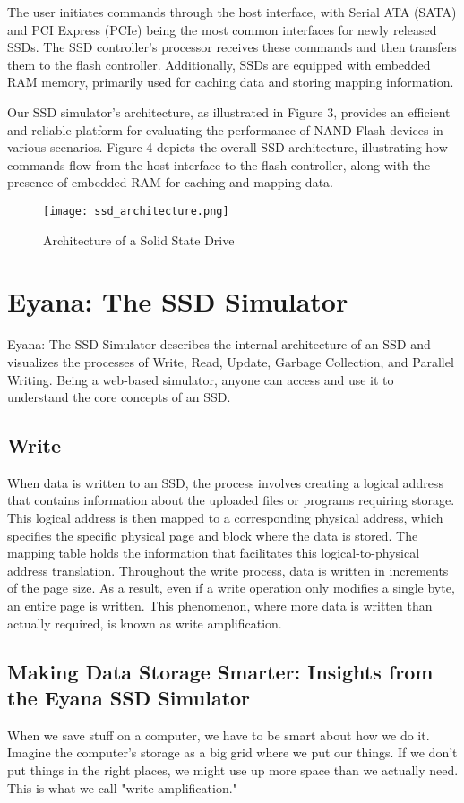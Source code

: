 \documentclass[conference]{/home/habib/Desktop/flash_ssd_simulator_web/paper_writing/latex_file/IEEEtran}
\begin{document}
The user initiates commands through the host interface, with Serial ATA (SATA) and PCI Express (PCIe) being the most common interfaces for newly released SSDs. The SSD controller's processor receives these commands and then transfers them to the flash controller. Additionally, SSDs are equipped with embedded RAM memory, primarily used for caching data and storing mapping information.

Our SSD simulator's architecture, as illustrated in Figure 3, provides an efficient and reliable platform for evaluating the performance of NAND Flash devices in various scenarios. Figure 4 depicts the overall SSD architecture, illustrating how commands flow from the host interface to the flash controller, along with the presence of embedded RAM for caching and mapping data.

\begin{figure}[h]
    \centering
    \texttt{[image: ssd\_architecture.png]}
    \caption{Architecture of a Solid State Drive}
    \label{fig:ssd_architecture}
\end{figure}

\section{Eyana: The SSD Simulator}
Eyana: The SSD Simulator describes the internal architecture of an SSD and visualizes the processes of Write, Read, Update, Garbage Collection, and Parallel Writing. Being a web-based simulator, anyone can access and use it to understand the core concepts of an SSD.

\subsection{Write}
When data is written to an SSD, the process involves creating a logical address that contains information about the uploaded files or programs requiring storage. This logical address is then mapped to a corresponding physical address, which specifies the specific physical page and block where the data is stored. The mapping table holds the information that facilitates this logical-to-physical address translation.
Throughout the write process, data is written in increments of the page size. As a result, even if a write operation only modifies a single byte, an entire page is written. This phenomenon, where more data is written than actually required, is known as write amplification.
\subsection{Making Data Storage Smarter: Insights from the Eyana SSD Simulator}
When we save stuff on a computer, we have to be smart about how we do it. Imagine the computer's storage as a big grid where we put our things. If we don't put things in the right places, we might use up more space than we actually need. This is what we call "write amplification."
\end{document}
